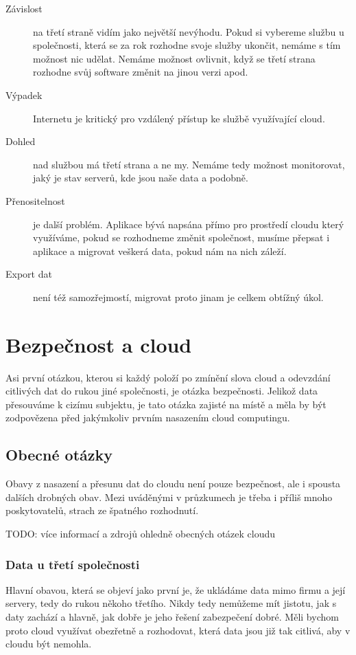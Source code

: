\begin{description}
  \item [Závislost] na třetí straně vidím jako největší nevýhodu. Pokud si vybereme službu u společnosti, která se za rok rozhodne svoje služby ukončit, nemáme s tím možnost nic udělat. Nemáme možnost ovlivnit, když se třetí strana rozhodne svůj software změnit na jinou verzi apod.
  \item [Výpadek] Internetu je kritický pro vzdálený přístup ke službě využívající cloud.
  \item [Dohled] nad službou má třetí strana a ne my. Nemáme tedy možnost monitorovat, jaký je stav serverů, kde jsou naše data a podobně.
  \item [Přenositelnost] je další problém. Aplikace bývá napsána přímo pro prostředí cloudu který využíváme, pokud se rozhodneme změnit společnost, musíme přepsat i aplikace a migrovat veškerá data, pokud nám na nich záleží.
  \item [Export dat] není též samozřejmostí, migrovat proto jinam je celkem obtížný úkol.
\end{description}

\section{Bezpečnost a cloud}
Asi první otázkou, kterou si každý položí po zmínění slova cloud a odevzdání citlivých dat do rukou jiné společnosti, je otázka bezpečnosti. Jelikož data přesouváme k cizímu subjektu, je tato otázka zajisté na místě a měla by být zodpovězena před jakýmkoliv prvním nasazením cloud computingu.

\subsection{Obecné otázky}
Obavy z nasazení a přesunu dat do cloudu není pouze bezpečnost, ale i spousta dalších drobných obav. Mezi uváděnými v průzkumech je třeba i příliš mnoho poskytovatelů, strach ze špatného rozhodnutí.\nocite{businessworld:prvniKroky}

TODO: více informací a zdrojů ohledně obecných otázek cloudu

\subsubsection{Data u třetí společnosti}
Hlavní obavou, která se objeví jako první je, že ukládáme data mimo firmu a její servery, tedy do rukou někoho třetího. Nikdy tedy nemůžeme mít jistotu, jak s daty zachází a hlavně, jak dobře je jeho řešení zabezpečení dobré. Měli bychom proto cloud využívat obezřetně a rozhodovat, která data jsou již tak citlivá, aby v cloudu být nemohla. 

